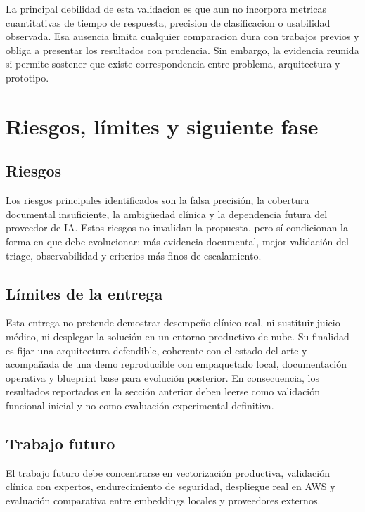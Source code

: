 \documentclass[12pt]{article}
\begin{document}
La principal debilidad de esta validacion es que aun no incorpora metricas cuantitativas de tiempo de respuesta, precision de clasificacion o usabilidad observada. Esa ausencia limita cualquier comparacion dura con trabajos previos y obliga a presentar los resultados con prudencia. Sin embargo, la evidencia reunida si permite sostener que existe correspondencia entre problema, arquitectura y prototipo.

\section{Riesgos, límites y siguiente fase}

\subsection{Riesgos}

Los riesgos principales identificados son la falsa precisión, la cobertura documental insuficiente, la ambigüedad clínica y la dependencia futura del proveedor de IA. Estos riesgos no invalidan la propuesta, pero sí condicionan la forma en que debe evolucionar: más evidencia documental, mejor validación del triage, observabilidad y criterios más finos de escalamiento.

\subsection{Límites de la entrega}

Esta entrega no pretende demostrar desempeño clínico real, ni sustituir juicio médico, ni desplegar la solución en un entorno productivo de nube. Su finalidad es fijar una arquitectura defendible, coherente con el estado del arte y acompañada de una demo reproducible con empaquetado local, documentación operativa y blueprint base para evolución posterior. En consecuencia, los resultados reportados en la sección anterior deben leerse como validación funcional inicial y no como evaluación experimental definitiva.

\subsection{Trabajo futuro}

El trabajo futuro debe concentrarse en vectorización productiva, validación clínica con expertos, endurecimiento de seguridad, despliegue real en AWS y evaluación comparativa entre embeddings locales y proveedores externos.
\end{document}
